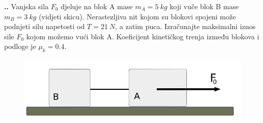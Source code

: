 


\noindent 
\textbf{
\thecjelina.\thezadatak.}
Vanjska sila $F_0$ djeluje na blok A mase $m_A= 5\ kg$ koji vuče blok B mase $m_B= 3\ kg$ (vidjeti skicu). Nerastezljiva nit kojom su blokovi spojeni može podnjeti silu napetosti od  $T=21\ N$, a zatim puca. Izračunajte maksimalni iznos sile $F_0$ kojom možemo vući blok A. Koeficijent kinetičkog trenja između blokova i podloge je $\mu_k=0.4$.


\begin{figure}[h]%
  \begin{center}
    \includegraphics[scale=0.30]{03_Dinamika_materijalne_tocke/blok_Zadatak_4_2.png}
  \end{center}
\end{figure}


